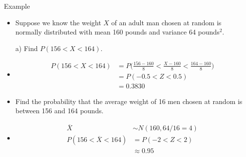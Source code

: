 \documentclass[10pt, xcolor=table]{beamer}
\begin{document}
\begin{frame}{Example}
\begin{itemize}
\item Suppose we know the weight $X$ of an adult man chosen at random is normally distributed with mean 160 pounds and variance 64 pounds$^2$. \\[10pt]
\item[a)] Find $P(156 < X < 164)$.
\item<2->[] {\color{red} 
\vspace*{-0.25cm}
\begin{align*}
P(156 < X < 164) &= P\bigg(\frac{156-160}{8} < \frac{X - 160}{8} < \frac{164-160}{8}\bigg) \\
&= P(-0.5 < Z < 0.5) \\
&=  0.3830
\end{align*}}
\vspace*{-0.25cm}
\item<3->[b)] Find the probability that the average weight of 16 men chosen at random is between 156 and 164 pounds.
\vspace*{-0.25cm}
\item<4->[] \color{red}
\begin{align*}
\overline{X} &\sim N(160, 64/16 = 4) \\
P(156 < \overline{X} < 164) &= P(-2 < Z < 2)\\
&\approx 0.95
\end{align*}
\end{itemize}
\end{frame}
\end{document}
